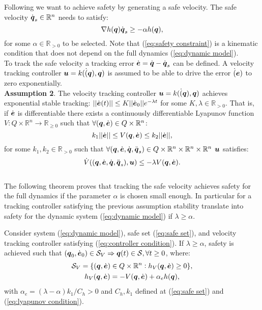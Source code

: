Following \cite{mf_cbf} we want to achieve safety by generating a safe velocity. The safe velocity $\dot{{\boldsymbol{q}}}_s \in \mathbb{R}^n$ needs to satisfy:
\begin{equation} \label{eq:safety constraint}
    \nabla h({\boldsymbol{q}})\dot{{\boldsymbol{q}}}_s \geq -\alpha h({\boldsymbol{q}}),
\end{equation}
for some $\alpha \in \mathbb{R}_{>0}$ to be selected. Note that (\ref{eq:safety constraint}) is a kinematic condition that does not depend on the full dynamics (\ref{eq:dynamic model}).\\
To track the safe velocity a tracking error $\dot{\boldsymbol{e}} = \dot{{\boldsymbol{q}}}-\dot{{\boldsymbol{q}}}_s$ can be defined. A velocity tracking controller $\boldsymbol{u} = k(\dot({\boldsymbol{q}}),{\boldsymbol{q}})$ is assumed to be able to drive the error $\dot(\boldsymbol{e})$ to zero exponentially.\\
\textbf{Assumption 2}. The velocity tracking controller $\boldsymbol{u} = k(\dot({\boldsymbol{q}}),{\boldsymbol{q}})$ achieves exponential stable tracking: $||\dot{\boldsymbol{e}}(t)||\leq K ||\dot{\boldsymbol{e}}_0|| e^{-\lambda t}$ for some $K,\lambda \in \mathbb{R}_{>0}$. That is, if $\dot{\boldsymbol{e}}$ is differentiable there exists a continuously differentiable Lyapunov function $V: Q \times \mathbb{R}^n \rightarrow \mathbb{R}_{\geq 0}$ such that $\forall({\boldsymbol{q}},\dot{\boldsymbol{e}})\in Q \times \mathbb{R}^n$:
\begin{equation} \label{eq:lyapunov condition}
    k_1 || \dot{\boldsymbol{e}}|| \leq V({\boldsymbol{q}}, \dot{\boldsymbol{e}}) \leq k_2 || \dot{\boldsymbol{e}}||,
\end{equation}
for some $k_1,k_2\in \mathbb{R}_{>0}$ such that $\forall({\boldsymbol{q}},\dot{\boldsymbol{e}},\dot{{\boldsymbol{q}}},\ddot{{\boldsymbol{q}}}_s)\in Q \times \mathbb{R}^n \times \mathbb{R}^n \times \mathbb{R}^n$ $\boldsymbol{u}$ satisfies:
\begin{equation} \label{eq:controller condition}
    \dot{V}(({\boldsymbol{q}},\dot{\boldsymbol{e}},\dot{{\boldsymbol{q}}},\ddot{{\boldsymbol{q}}}_s),\boldsymbol{u}) \leq -\lambda V({\boldsymbol{q}},\dot{\boldsymbol{e}}).
\end{equation}\\

The following theorem proves that tracking the safe velocity achieves safety for the full dynamics if the parameter $\alpha$ is chosen small enough. In particular for a tracking controller satisfying the previous assumption stability translate into safety for the dynamic system (\ref{eq:dynamic model}) if $\lambda \geq \alpha$. \\
\begin{theorem}\label{th:alpha limit}
    Consider system (\ref{eq:dynamic model}), safe set (\ref{eq:safe set}), and velocity tracking controller satisfying (\ref{eq:controller condition}). If $\lambda \geq \alpha$, safety is achieved such that $({\boldsymbol{q}}_0,\dot{\boldsymbol{e}}_0)\in \mathcal{S}_V \Rightarrow {\boldsymbol{q}}(t) \in \mathcal{S}, \forall t\geq 0$, where:
    \begin{multline}
        \mathcal{S}_V = \{ ({\boldsymbol{q}},\dot{\boldsymbol{e}})\in Q \times \mathbb{R}^n: h_V({\boldsymbol{q}},\dot{\boldsymbol{e}})\geq 0 \},\\
        h_V({\boldsymbol{q}},\dot{\boldsymbol{e}}) = -V({\boldsymbol{q}},\dot{\boldsymbol{e}})+ \alpha_e h({\boldsymbol{q}}),
    \end{multline}
    with $\alpha_e = (\lambda - \alpha)k_1/C_h > 0$ and $C_h,k_1$ defined at (\ref{eq:safe set}) and (\ref{eq:lyapunov condition}).
\end{theorem}

